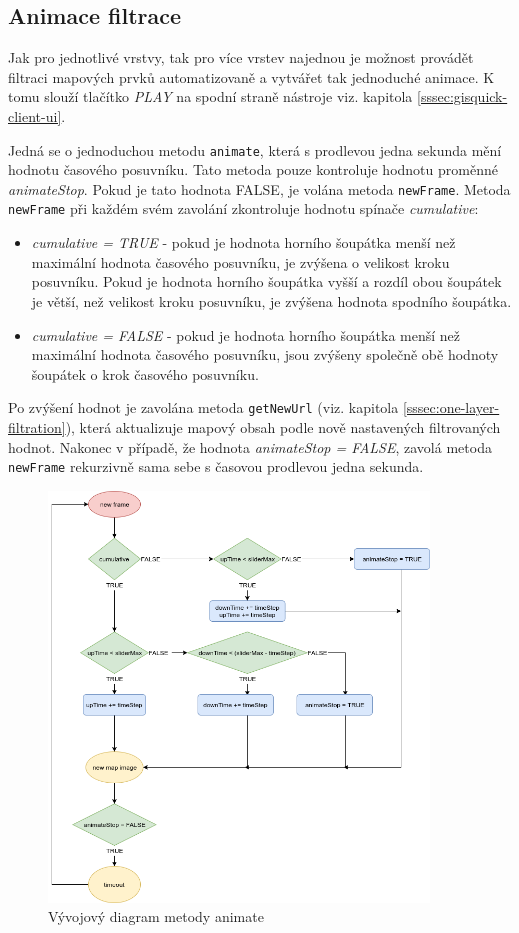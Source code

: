 \subsection{Animace filtrace}
\label{sssec:animation}

Jak pro jednotlivé vrstvy, tak pro více vrstev najednou je možnost
provádět filtraci mapových prvků automatizovaně a vytvářet tak
jednoduché animace. K tomu slouží tlačítko \textit{PLAY} na spodní
straně nástroje viz. kapitola \ref{sssec:gisquick-client-ui}.

Jedná se o jednoduchou metodu \verb|animate|, která s prodlevou jedna
sekunda mění hodnotu časového posuvníku. Tato metoda pouze kontroluje
hodnotu proměnné \textit{animateStop}. Pokud je tato hodnota FALSE, je
volána metoda \verb|newFrame|. Metoda \verb|newFrame| při každém svém
zavolání zkontroluje hodnotu spínače \textit{cumulative}:
\begin{itemize}
\item\textit{cumulative = TRUE} - pokud je hodnota horního šoupátka
menší než maximální hodnota časového posuvníku, je zvýšena
o velikost kroku posuvníku. Pokud je hodnota horního šoupátka vyšší a rozdíl obou šoupátek je větší, než velikost kroku posuvníku, je zvýšena hodnota spodního šoupátka.
\item\textit{cumulative = FALSE} - pokud je hodnota horního šoupátka
menší než maximální hodnota časového posuvníku, jsou zvýšeny
společně obě hodnoty šoupátek o krok časového posuvníku.
\end{itemize}
Po zvýšení hodnot je zavolána metoda \verb|getNewUrl| (viz. kapitola
\ref{sssec:one-layer-filtration}), která aktualizuje mapový obsah podle
nově nastavených filtrovaných hodnot. Nakonec v případě, že hodnota
\textit{animateStop = FALSE}, zavolá metoda \verb|newFrame| rekurzivně sama sebe s časovou prodlevou jedna sekunda.

\begin{figure}[h!]
\centering
\includegraphics[width=0.9\textwidth]{../img/animate.png}
\caption{Vývojový diagram metody animate}
\label{fig:animate-chart}
\end{figure}
